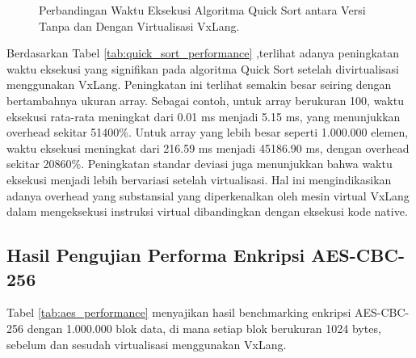 \begin{figure}[htbp]
    \centering
    \caption{Perbandingan Waktu Eksekusi Algoritma Quick Sort antara Versi Tanpa dan Dengan Virtualisasi VxLang.}
    \label{fig:quick_sort_performance}
\end{figure}

Berdasarkan Tabel \ref{tab:quick_sort_performance} ,terlihat adanya peningkatan waktu eksekusi yang signifikan pada algoritma Quick Sort setelah divirtualisasi menggunakan VxLang. Peningkatan ini terlihat semakin besar seiring dengan bertambahnya ukuran array. Sebagai contoh, untuk array berukuran 100, waktu eksekusi rata-rata meningkat dari 0.01 ms menjadi 5.15 ms, yang menunjukkan overhead sekitar 51400\%. Untuk array yang lebih besar seperti 1.000.000 elemen, waktu eksekusi meningkat dari 216.59 ms menjadi 45186.90 ms, dengan overhead sekitar 20860\%. Peningkatan standar deviasi juga menunjukkan bahwa waktu eksekusi menjadi lebih bervariasi setelah virtualisasi. Hal ini mengindikasikan adanya overhead yang substansial yang diperkenalkan oleh mesin virtual VxLang dalam mengeksekusi instruksi virtual dibandingkan dengan eksekusi kode native.

\subsection{Hasil Pengujian Performa Enkripsi AES-CBC-256}
Tabel \ref{tab:aes_performance} menyajikan hasil benchmarking enkripsi AES-CBC-256 dengan 1.000.000 blok data, di mana setiap blok berukuran 1024 bytes, sebelum dan sesudah virtualisasi menggunakan VxLang.

